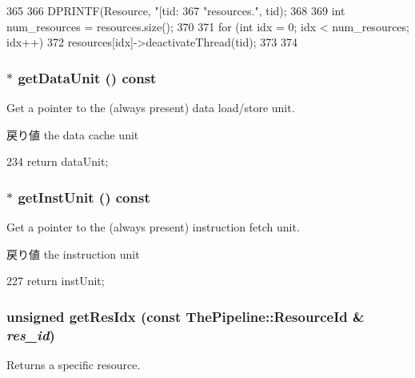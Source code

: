 \begin{DoxyCode}
365 {
366     DPRINTF(Resource, "[tid:%
367             "resources.\n", tid);
368 
369     int num_resources = resources.size();
370 
371     for (int idx = 0; idx < num_resources; idx++) {
372         resources[idx]->deactivateThread(tid);
373     }
374 }
\end{DoxyCode}
\hypertarget{classResourcePool_ab2c545b49e59a8de568a4f7a6cbd7d32}{
\subsubsection[{getDataUnit}]{$\ast$ getDataUnit () const}}
\label{classResourcePool_ab2c545b49e59a8de568a4f7a6cbd7d32}
Get a pointer to the (always present) data load/store unit.

\begin{DoxyReturn}{戻り値}
the data cache unit 
\end{DoxyReturn}



\begin{DoxyCode}
234 { return dataUnit; }
\end{DoxyCode}
\hypertarget{classResourcePool_a6a12b19003afbeeb3b69b71ced3b2a6e}{
\subsubsection[{getInstUnit}]{$\ast$ getInstUnit () const}}
\label{classResourcePool_a6a12b19003afbeeb3b69b71ced3b2a6e}
Get a pointer to the (always present) instruction fetch unit.

\begin{DoxyReturn}{戻り値}
the instruction unit 
\end{DoxyReturn}



\begin{DoxyCode}
227 { return instUnit; }
\end{DoxyCode}
\hypertarget{classResourcePool_aa590916e201f046ca64fa621f9e3dc0c}{
\subsubsection[{getResIdx}]{\setlength{\rightskip}{0pt plus 5cm}unsigned getResIdx (const {\bf ThePipeline::ResourceId} \& {\em res\_\-id})}}
\label{classResourcePool_aa590916e201f046ca64fa621f9e3dc0c}
Returns a specific resource. 


